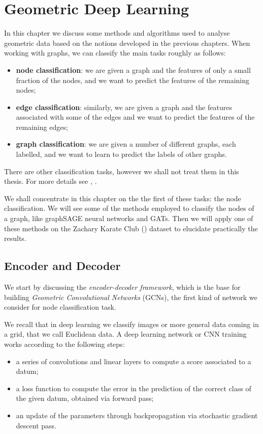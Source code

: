 \documentclass[12pt,a4paper]{report}
\theoremstyle{definition}
\begin{document}
\chapter{Geometric Deep Learning}
\label{cap:GDL}

In this chapter we discuss some methods and algorithms used to analyse geometric data based on the notions developed in the previous chapters.
When working with graphs, we can classify the main tasks roughly as follows:
\begin{itemize}
    \item \textbf{node classification}: we are given a graph and the features of only a small fraction of the nodes, and we want to predict the features of the remaining nodes;
    \item \textbf{edge classification}: similarly, we are given a graph and the features associated with some of the edges and we want to predict the features of the remaining edges;
    \item \textbf{graph classification}: we are given a number of different graphs, each labelled, and we want to learn to predict the labels of other graphs.
\end{itemize}
There are other classification tasks, however we shall not treat them in this thesis.
For more details see \cite{Beyound_eucl_data}, \cite{Kipf_welling}.

We shall concentrate in this chapter on the the first of these tasks: the node classification.
We will see some of the methods employed to classify the nodes of a graph, like graphSAGE neural networks and GATs.
Then we will apply one of these methods on the Zachary Karate Club (\cite{Kipf_welling}) dataset to elucidate practically the results.

\section{Encoder and Decoder}
\label{sec:encoder}

We start by discussing the \emph{encoder-decoder framework}, which is the base for building \emph{Geometric Convolutional Networks} (GCNs), the first kind of network we consider for node classification task.

We recall that in deep learning we classify images or more general data coming in a grid, that we call Euclidean data.
A deep learning network or CNN training works according to the following steps:
\begin{itemize}
    \item a series of convolutions and linear layers to compute a score associated to a datum;
    \item a loss function to compute the error in the prediction of the correct class of the given datum, obtained via forward pass;
    \item an update of the parameters through backpropagation via stochastic gradient descent pass.
\end{itemize}
\end{document}
